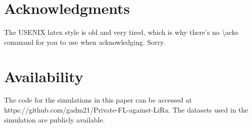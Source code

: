 \section*{Acknowledgments}


The USENIX latex style is old and very tired, which is why
there's no \textbackslash{}acks command for you to use when
acknowledging. Sorry.

\section*{Availability}

The code for the simulations in this paper can be accessed at https://github.com/gadm21/Private-FL-against-LiRa. The datasets used in the simulation are publicly available. 









